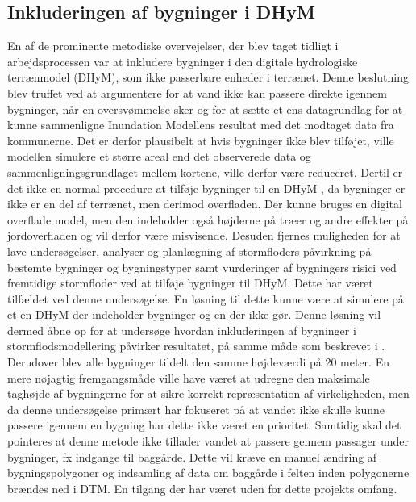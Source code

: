 \subsection{Inkluderingen af bygninger i DHyM}
En af de prominente metodiske overvejelser, der blev taget tidligt i arbejdsprocessen var at inkludere bygninger i den digitale hydrologiske terrænmodel (DHyM), som ikke passerbare enheder i terrænet. Denne beslutning blev truffet ved at argumentere for at vand ikke kan passere direkte igennem bygninger, når en oversvømmelse sker og for at sætte et ens datagrundlag for at kunne sammenligne Inundation Modellens resultat med det modtaget data fra kommunerne. Det er derfor plausibelt at hvis bygninger ikke blev tilføjet, ville modellen simulere et større areal end det observerede data og sammenligningsgrundlaget mellem kortene, ville derfor være reduceret. 
Dertil er det ikke en normal procedure at tilføje bygninger til en DHyM \citep{khosh_bin_ghomash_technical_2024}, da bygninger er ikke er en del af terrænet, men derimod overfladen. Der kunne bruges en digital overflade model, men den indeholder også højderne på træer og andre effekter på jordoverfladen og vil derfor være misvisende. Desuden fjernes muligheden for at lave undersøgelser, analyser og planlægning af stormfloders påvirkning på bestemte bygninger og bygningstyper samt vurderinger af bygningers risici ved fremtidige stormfloder ved at tilføje bygninger til DHyM. Dette har været tilfældet ved denne undersøgelse. En løsning til dette kunne være at simulere på et en DHyM der indeholder bygninger og en der ikke gør. Denne løsning vil dermed åbne op for at undersøge hvordan inkluderingen af bygninger i stormflodsmodellering påvirker resultatet, på samme måde som beskrevet i \cite{khosh_bin_ghomash_technical_2024}.\\

Derudover blev alle bygninger tildelt den samme højdeværdi på 20 meter. En mere nøjagtig fremgangsmåde ville have været at udregne den maksimale taghøjde af bygningerne for at sikre korrekt repræsentation af virkeligheden, men da denne undersøgelse primært har fokuseret på at vandet ikke skulle kunne passere igennem en bygning har dette ikke været en prioritet. Samtidig skal det pointeres at denne metode ikke tillader vandet at passere gennem passager under bygninger, fx indgange til baggårde. Dette vil kræve en manuel ændring af bygningspolygoner og indsamling af data om baggårde i felten inden polygonerne brændes ned i DTM. En tilgang der har været uden for dette projekts omfang.

